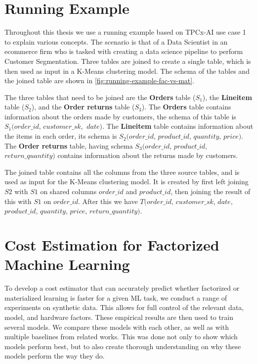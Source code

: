 \section{Running Example}
Throughout this thesis we use a running example based on TPCx-AI\cite{tpcx-ai} use case 1 to explain various concepts. The scenario is that of a Data Scientist in an ecommerce firm who is tasked with creating a data science pipeline to perform Customer Segmentation. Three tables are joined to create a single table, which is then used as input in a K-Means clustering model. The schema of the tables and the joined table are shown in \autoref{fig:running-example-fac-vs-mat}.

The three tables that need to be joined are the \textbf{Orders} table ($S_1$), the \textbf{Lineitem} table ($S_2$), and the \textbf{Order returns} table ($S_3$). The \textbf{Orders} table contains information about the orders made by customers, the schema of this table is $S_1(order\_id$, $customer\_sk$, $\ date)$. The \textbf{Lineitem} table contains information about the items in each order, its schema is $S_2(order\_id$, $product\_id$, $quantity$,  $price)$. The \textbf{Order returns} table, having schema $S_3(order\_id$, $product\_id$, $return\_quantity)$ contains information about the returns made by customers.

The joined table contains all the columns from the three source tables, and is used as input for the K-Means clustering model. It is created by first left joining $S2$ with $S1$ on shared columns $order\_id$ and $product\_id$, then joining the result of this with $S1$ on $order\_id$. After this we have $T(order\_id$, $customer\_sk$, $date$, $product\_id$, $quantity$, $price$, $return\_quantity)$.

\section{Cost Estimation for Factorized Machine Learning}
To develop a cost estimator that can accurately predict whether factorized or materialized learning is faster for a given ML task, we conduct a range of experiments on synthetic data. This allows for full control of the relevant data, model, and hardware factors. These empirical results are then used to train several models. We compare these models with each other, as well as with multiple baselines from related works. This was done not only to show which models perform best, but to also create thorough understanding on why these models perform the way they do.

